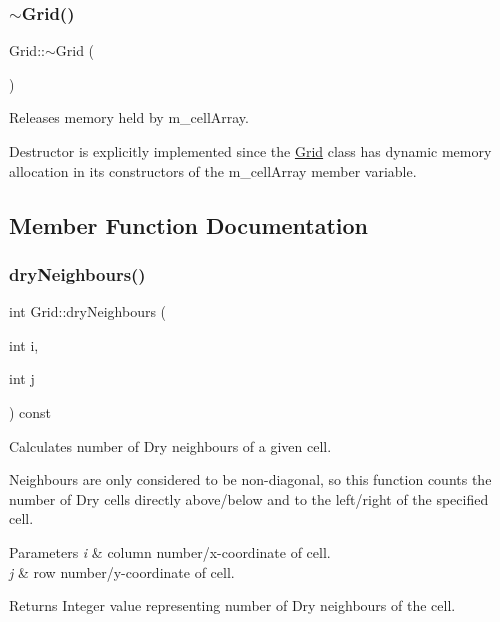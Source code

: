 \subsubsection{\texorpdfstring{$\sim$\+Grid()}{~Grid()}}
{\footnotesize\ttfamily Grid\+::$\sim$\+Grid (\begin{DoxyParamCaption}{ }\end{DoxyParamCaption})}



Releases memory held by m\+\_\+cell\+Array. 

Destructor is explicitly implemented since the \hyperlink{class_grid}{Grid} class has dynamic memory allocation in its constructors of the m\+\_\+cell\+Array member variable. 

\subsection{Member Function Documentation}
\mbox{\label{class_grid_a50f4c0db20b466c84a1d65004e51642e}} 
\subsubsection{\texorpdfstring{dry\+Neighbours()}{dryNeighbours()}}
{\footnotesize\ttfamily int Grid\+::dry\+Neighbours (\begin{DoxyParamCaption}\item[{int}]{i,  }\item[{int}]{j }\end{DoxyParamCaption}) const}



Calculates number of Dry neighbours of a given cell. 

Neighbours are only considered to be non-\/diagonal, so this function counts the number of Dry cells directly above/below and to the left/right of the specified cell.


\begin{DoxyParams}{Parameters}
{\em i} & column number/x-\/coordinate of cell.\\
\hline
{\em j} & row number/y-\/coordinate of cell.\\
\hline
\end{DoxyParams}
\begin{DoxyReturn}{Returns}
Integer value representing number of Dry neighbours of the cell. 
\end{DoxyReturn}
\mbox{\label{class_grid_a425801f2747d6be34c10eb6535ab0829}} 
